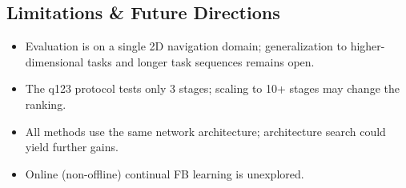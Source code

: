 \documentclass[11pt,a4paper]{article}
\begin{document}
\subsection{Limitations \& Future Directions}
\begin{itemize}
    \item Evaluation is on a single 2D navigation domain; generalization to higher-dimensional
    tasks and longer task sequences remains open.
    \item The q123 protocol tests only 3 stages; scaling to 10+ stages may change the ranking.
    \item All methods use the same network architecture; architecture search could yield further gains.
    \item Online (non-offline) continual FB learning is unexplored.
\end{itemize}
\end{document}
